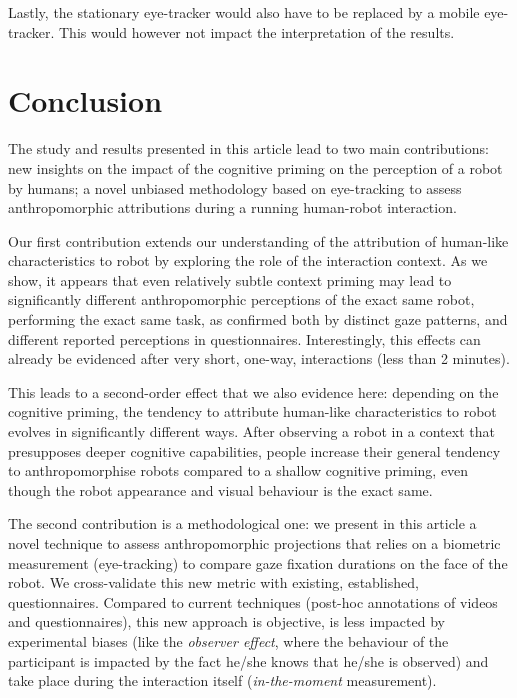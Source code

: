 \documentclass[lettersize, noapacite, twoside, HRI]{apa_HRI}
\begin{document}
Lastly, the stationary eye-tracker would also have to be replaced by a mobile
eye-tracker. This would however not impact the interpretation of the results.

\section{Conclusion}

The study and results presented in this article lead to two main contributions:
new insights on the impact of the cognitive priming on the perception of a robot
by humans; a novel unbiased methodology based on eye-tracking to assess
anthropomorphic attributions during a running human-robot interaction.

Our first contribution extends our understanding of the attribution of
human-like characteristics to robot by exploring the role of the interaction
context. As we show, it appears that even relatively subtle context
priming may lead to significantly different anthropomorphic perceptions of
the exact same robot, performing the exact same task, as confirmed both by
distinct gaze patterns, and different reported perceptions in questionnaires.
Interestingly, this effects can already be evidenced after very short,
one-way, interactions (less than 2 minutes).

This leads to a second-order effect that we also evidence here: depending on the
cognitive priming, the tendency to attribute human-like characteristics to robot
evolves in significantly different ways. After observing a robot in a
context that presupposes deeper cognitive capabilities, people increase
their general tendency to anthropomorphise robots compared to a shallow
cognitive priming, even though the robot appearance and visual behaviour is the
exact same.

The second contribution is a methodological one: we present in this article
a novel technique to assess anthropomorphic projections that relies on a
biometric measurement (eye-tracking) to compare gaze fixation durations on
the face of the robot. We cross-validate this new metric with existing,
established, questionnaires. Compared to current techniques (post-hoc
annotations of videos and questionnaires), this new approach is objective,
is less impacted by experimental biases (like the \emph{observer effect},
where the behaviour of the participant is impacted by the fact he/she knows that
he/she is observed) and take place during the interaction itself
(\emph{in-the-moment} measurement).
\end{document}
